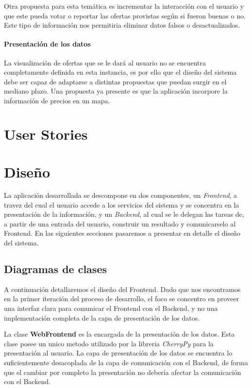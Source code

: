 \documentclass[10pt, a4paper]{article}
\begin{document}
Otra propuesta para esta temática es incrementar la interacción con el usuario y que este pueda votar o reportar las ofertas provistas según si fueron buenas o no. Este tipo de información nos permitiria eliminar datos falsos o desactualizados.

\paragraph{Presentación de los datos}
La visualización de ofertas que se le dará al usuario no se encuentra completamente definida en esta instancia, es por ello que el diseño del sistema debe ser capaz de adaptarse a distintas propuestas que puedan surgir en el mediano plazo. Una propuesta ya presente es que la aplicación incorpore la información de precios en un mapa.


\section{User Stories}




\section{Diseño}

La aplicación desarrollada se descompone en dos componentes, un \emph{Frontend}, a travez del cual el usuario accede a los servicios del sistema y se concentra en la presentación de la información, y un \emph{Backend}, al cual se le delegan las tareas de, a partir de una entrada del usuario, construir un resultado y comunicarselo al Frontend. En las siguientes secciones pasaremos a presentar en detalle el diseño del sistema.

\subsection{Diagramas de clases}
  
A continuación detallaremos el diseño del Frontend. Dado que nos encontramos en la primer iteración del proceso de desarrollo, el foco se concentro en proveer una interfaz clara para comunicar el Frontend con el Backend, y no una implementación completa de la capa de presentación de los datos.

La clase \textbf{WebFrontend} es la encargada de la presentación de los datos. Esta clase posee un unico metodo utilizado por la libreria \emph{CherryPy} para la presentación  al usuario. La capa de presentación de los datos se encuentra lo suficientemente desacoplada de la capa de comunicación con el Backend, de forma que el cambiar por completo la presentación no debería afectar la comunicación con el Backend.
\end{document}
